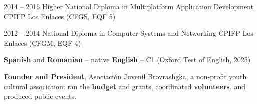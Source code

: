 \documentclass[9pt]{developercv} %
\begin{document}
\begin{entrylist}
	\shortentry
		{2014 -- 2016}
		{Higher National Diploma in Multiplatform Application Development}
		{CPIFP Los Enlaces (CFGS, EQF 5)}
		{}

	\shortentry
		{2012 -- 2014}
		{National Diploma in Computer Systems and Networking}
		{CPIFP Los Enlaces (CFGM, EQF 4)}
		{}
\end{entrylist}

%

\textbf{Spanish} and \textbf{Romanian} -- native \quad\textbullet\quad \textbf{English} -- C1 (Oxford Test of English, 2025)

\textbf{Founder and President}, Asociación Juvenil Brovrashgka, a non-profit youth cultural association: ran the \textbf{budget} and grants, coordinated \textbf{volunteers}, and produced public events.
\end{document}
